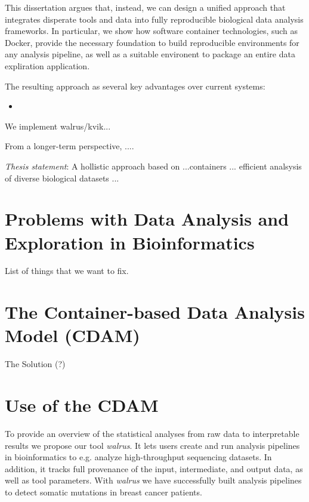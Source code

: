 This dissertation argues that, instead, we can design a unified approach that
integrates disperate tools and data into fully reproducible biological data
analysis frameworks.  In particular, we show how software container
technologies, such as Docker, 
provide the necessary foundation to build reproducible environments for any
analysis pipeline, as well as a suitable environent to package an entire data
expliration application. 

The resulting approach as several key advantages over current systems: 
\begin{itemize} 
    \item
\end{itemize} 

We implement walrus/kvik... 

From a longer-term perspective, ....

\emph{Thesis statement}:
A hollistic approach based on ...containers ... efficient analsysis of diverse
biological datasets ... 

\section{Problems with Data Analysis and Exploration in Bioinformatics} 
    List of things that we want to fix. 

\section{The Container-based Data Analysis Model (CDAM)} 
    The Solution (?) 

\section{Use of the CDAM} 

To provide an overview of the statistical analyses from raw data to
interpretable results we propose our tool \emph{walrus}. It lets users create
and run analysis pipelines in bioinformatics to e.g. analyze high-throughput
sequencing datasets. In addition, it tracks full provenance of the input,
intermediate, and output data, as well as tool parameters. With \emph{walrus} we
have successfully built analysis pipelines to detect somatic mutations in breast
cancer patients. 

